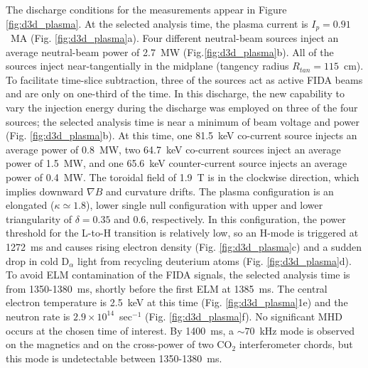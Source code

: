 The discharge conditions for the measurements appear in Figure \ref{fig:d3d_plasma}. At the selected analysis time, the plasma current is $I_p=0.91$~MA (Fig. \ref{fig:d3d_plasma}a). Four different neutral-beam sources inject an average neutral-beam power of 2.7~MW (Fig.\ref{fig:d3d_plasma}b). All of the sources inject near-tangentially in the midplane (tangency radius $R_{tan}=115$~cm). To facilitate time-slice subtraction, three of the sources act as active FIDA beams and are only on one-third of the time. In this discharge, the new capability to vary the injection energy during the discharge \cite{pace2016control} was employed on three of the four sources; the selected analysis time is near a minimum of beam voltage and power (Fig. \ref{fig:d3d_plasma}b). At this time, one 81.5~keV co-current source injects an average power of 0.8~MW, two 64.7~keV co-current sources inject an average power of 1.5~MW, and one 65.6~keV counter-current source injects an average power of 0.4~MW. The toroidal field of 1.9~T is in the clockwise direction, which implies downward $\nabla B$ and curvature drifts. The plasma configuration is an elongated ($\kappa\simeq1.8$), lower single null configuration with upper and lower triangularity of $\delta=0.35$ and 0.6, respectively. In this configuration, the power threshold for the L-to-H transition is relatively low, so an H-mode is triggered at 1272~ms and causes rising electron density (Fig. \ref{fig:d3d_plasma}c) and a sudden drop in cold D$_\alpha$ light from recycling deuterium atoms (Fig. \ref{fig:d3d_plasma}d).  To avoid ELM contamination of the FIDA signals, the selected analysis time is from 1350-1380~ms, shortly before the first ELM at 1385~ms.  The central electron temperature is 2.5~keV at this time (Fig. \ref{fig:d3d_plasma}1e) and the neutron rate is $2.9\times10^{14}$~sec$^{-1}$ (Fig. \ref{fig:d3d_plasma}f).
No significant MHD occurs at the chosen time of interest. By 1400~ms, a $\sim70$~kHz mode is observed on the magnetics and on the cross-power of two CO$_2$ interferometer chords, but this mode is undetectable between 1350-1380~ms.

